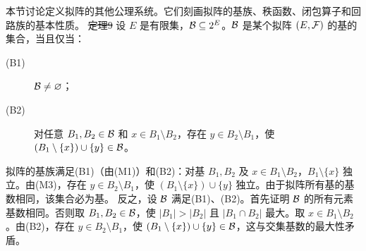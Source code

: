 本节讨论定义拟阵的其他公理系统。它们刻画拟阵的基族、秩函数、闭包算子和回路族的基本性质。
\st{定理9} 设 $E$ 是有限集，$\mathcal B\subseteq2^E$。$\mathcal B$ 是某个拟阵 $(E,\mathcal F)$ 的基的集合，当且仅当：
\begin{description}
\item[(B1)] $\mathcal B\ne\varnothing$；
\item[(B2)] 对任意 $B_1,B_2\in\mathcal B$ 和 $x\in B_1\setminus B_2$，存在 $y\in B_2\setminus B_1$，使 $(B_1\setminus\{x\})\cup\{y\}\in\mathcal B$。
\end{description}
\pr 拟阵的基族满足(B1)（由(M1)）和(B2)：对基 $B_1,B_2$ 及 $x\in B_1\setminus B_2$，$B_1\setminus\{x\}$ 独立。由(M3)，存在 $y\in B_2\setminus B_1$，使 $(B_1\setminus\{x\})\cup\{y\}$ 独立。由于拟阵所有基的基数相同，该集合必为基。
反之，设 $\mathcal B$ 满足(B1)、(B2)。首先证明 $\mathcal B$ 的所有元素基数相同。否则取 $B_1,B_2\in\mathcal B$，使 $|B_1|>|B_2|$ 且 $|B_1\cap B_2|$ 最大。取 $x\in B_1\setminus B_2$。由(B2)，存在 $y\in B_2\setminus B_1$，使 $(B_1\setminus\{x\})\cup\{y\}\in\mathcal B$，这与交集基数的最大性矛盾。

